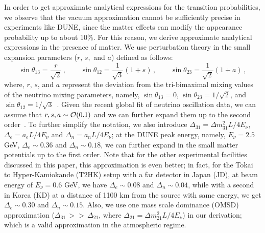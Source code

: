 \documentclass[11pt,a4paper]{article}
\begin{document}
In order to get approximate analytical expressions for the transition probabilities,  we observe that the vacuum approximation cannot be sufficiently precise in  experiments like DUNE, since the matter effects can modify the appearance probability up to about 10\%. For this reason, we derive approximate analytical expressions in the presence of matter. We use perturbation theory in the small expansion
parameters ($r,\,s,$ and $a$) defined as follows:
\begin{equation}
\label{expansion}
\sin \theta_{13} = \frac{r}{\sqrt{2}}\,, \qquad \sin \theta_{12} = \frac{1}{\sqrt{3}}(1+s)\,,\qquad \sin \theta_{23} =  \frac{1}{\sqrt{2}}(1+a)\,,
\end{equation}
where, $r,\, s$, and $a$ represent the deviation from the tri-bimaximal mixing values of the neutrino mixing parameters, namely, $\sin \theta_{13}=0$, $\sin \theta_{23} = 1/\sqrt{2}$, and $\sin \theta_{12} = 1/\sqrt{3}$~\cite{King:2007pr,Pakvasa:2007zj}. Given the recent global fit of neutrino oscillation data, we can assume that $r,s,a \sim {\cal O}(0.1)$ and we can further expand them up to the second order~\cite{NuFIT,Esteban:2020cvm,deSalas:2020pgw,Capozzi:2021fjo}. 
To further simplify the notation, we also introduce  $\Delta_{31} = \Delta m_{31}^2 L/ 4E_\nu$,  $\Delta_e = a_e L/ 4E_\nu$ and $\Delta_n = a_n L/ 4E_\nu$; at the DUNE peak energy, namely, $E_\nu = 2.5$ GeV, $\Delta_e \sim 0.36$ and $\Delta_n \sim 0.18$, we can further expand in the small matter potentials up to the first order. Note that for the other experimental facilities discussed in this paper, this approximation is even better; in fact, for the Tokai to Hyper-Kamiokande (T2HK)  setup with a far detector in Japan (JD),  at beam energy of $E_\nu =0.6$ GeV, we have $\Delta_e \sim 0.08$ and $\Delta_n \sim 0.04$, while with a second  in Korea (KD) at a distance of 1100 km from the source with same energy, we get $\Delta_e \sim 0.30$ and $\Delta_n \sim 0.15$. Also, we use one mass scale dominance (OMSD) approximation ($\Delta_{31}\,>>\,\Delta_{21}$, where $\Delta_{21}=\Delta m^2_{21}L/4E_{\nu}$) in our derivation; which is a valid approximation in the atmospheric regime.
\end{document}
